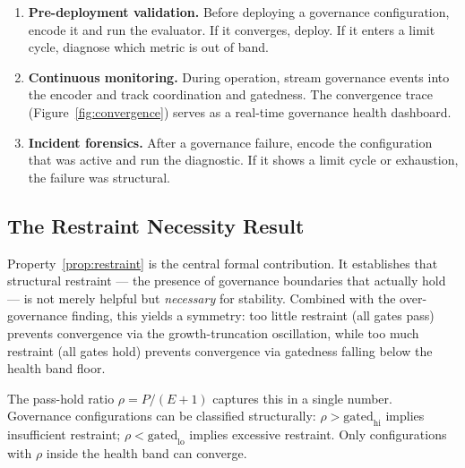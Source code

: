 \documentclass[sigconf,nonacm]{acmart}
\begin{document}
\begin{enumerate}[leftmargin=*]
  \item \textbf{Pre-deployment validation.} Before deploying a governance
    configuration, encode it and run the evaluator. If it converges,
    deploy. If it enters a limit cycle, diagnose which metric is out of
    band.

  \item \textbf{Continuous monitoring.} During operation, stream
    governance events into the encoder and track coordination and
    gatedness. The convergence trace (Figure~\ref{fig:convergence})
    serves as a real-time governance health dashboard.

  \item \textbf{Incident forensics.} After a governance failure, encode
    the configuration that was active and run the diagnostic. If it shows
    a limit cycle or exhaustion, the failure was structural.
\end{enumerate}

\subsection{The Restraint Necessity Result}

Property~\ref{prop:restraint} is the central formal contribution. It
establishes that structural restraint --- the presence of governance
boundaries that actually hold --- is not merely helpful but
\emph{necessary} for stability. Combined with the over-governance
finding, this yields a symmetry: too little restraint (all gates pass)
prevents convergence via the growth-truncation oscillation, while too
much restraint (all gates hold) prevents convergence via gatedness
falling below the health band floor.

The pass-hold ratio $\rho = P/(E+1)$ captures this in a single number.
Governance configurations can be classified structurally:
$\rho > \mathrm{gated}_{\mathrm{hi}}$ implies insufficient restraint;
$\rho < \mathrm{gated}_{\mathrm{lo}}$ implies excessive restraint. Only
configurations with $\rho$ inside the health band can converge.
\end{document}
